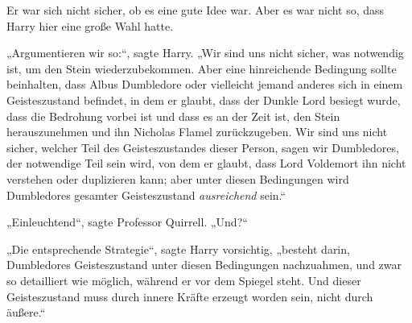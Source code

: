 Er war sich nicht sicher, ob es eine gute Idee war. Aber es war nicht so, dass Harry hier eine große Wahl hatte.

„Argumentieren wir so:“, sagte Harry. „Wir sind uns nicht sicher, was notwendig ist, um den Stein wiederzubekommen. Aber eine hinreichende Bedingung sollte beinhalten, dass Albus Dumbledore oder vielleicht jemand anderes sich in einem Geisteszustand befindet, in dem er glaubt, dass der Dunkle Lord besiegt wurde, dass die Bedrohung vorbei ist und dass es an der Zeit ist, den Stein herauszunehmen und ihn Nicholas Flamel zurückzugeben. Wir sind uns nicht sicher, welcher Teil des Geisteszustandes dieser Person, sagen wir Dumbledores, der notwendige Teil sein wird, von dem er glaubt, dass Lord Voldemort ihn nicht verstehen oder duplizieren kann; aber unter diesen Bedingungen wird Dumbledores gesamter Geisteszustand \emph{ausreichend} sein.“

„Einleuchtend“, sagte Professor Quirrell. „Und?“

„Die entsprechende Strategie“, sagte Harry vorsichtig, „besteht darin, Dumbledores Geisteszustand unter diesen Bedingungen nachzuahmen, und zwar so detailliert wie möglich, während er vor dem Spiegel steht. Und dieser Geisteszustand muss durch innere Kräfte erzeugt worden sein, nicht durch äußere.“

